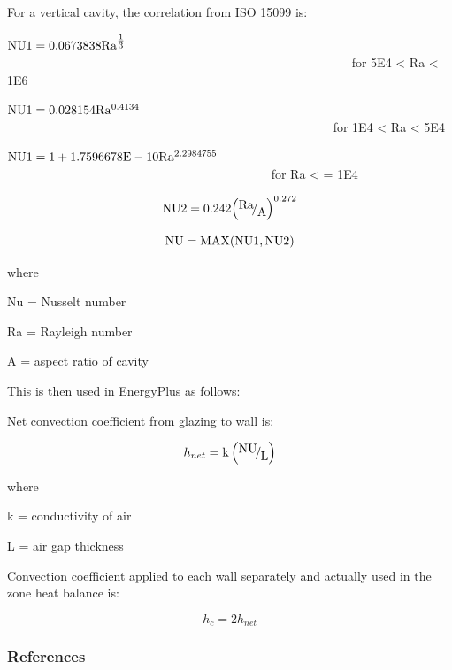 For a vertical cavity, the correlation from ISO 15099 is:

\({\rm{NU1 = 0}}{\rm{.0673838 R}}{{\rm{a}}^{{\textstyle{\frac{{\rm{1}}}{{\rm{3}}}}}}}\) ~~~~~~~~~~~~~~~~~~~~~~~~~~~~~~~~~~~~~~~~~~~~~~~~~~~~~~~ for 5E4 \textless{} Ra \textless{} 1E6

\({\rm{NU1 = 0}}{\rm{.028154 R}}{{\rm{a}}^{{\rm{0}}{\rm{.4134}}}}\) ~~~~~~~~~~~~~~~~~~~~~~~~~~~~~~~~~~~~~~~~~~~~~~~~~~~~ for 1E4 \textless{} Ra \textless{} 5E4

\({\rm{NU1 = 1 + 1}}{\rm{.7596678E - 10 R}}{{\rm{a}}^{{\rm{2}}{\rm{.2984755}}}}\) ~~~~~~~~~~~~~~~~~~~~~~~~~~~~~~~~~~~~~~~~~~ for Ra \textless{} = 1E4

\begin{equation}
{\rm{NU2}} = 0.242{\left( {{\raise0.7ex\hbox{{{\rm{Ra}}}} \!\mathord{\left/ {\vphantom {{{\rm{Ra}}} {\rm{A}}}}\right.}\!\lower0.7ex\hbox{{\rm{A}}}}} \right)^{0.272}}
\end{equation}

\begin{equation}
{\rm{NU = MAX(NU1,NU2)}}
\end{equation}

where

Nu = Nusselt number

Ra = Rayleigh number

A = aspect ratio of cavity

This is then used in EnergyPlus as follows:

Net convection coefficient from glazing to wall is:

\begin{equation}
{h_{net}} = {\rm{k}}\left( {{\raise0.7ex\hbox{{{\rm{NU}}}} \!\mathord{\left/ {\vphantom {{{\rm{NU}}} {\rm{L}}}}\right.}\!\lower0.7ex\hbox{{\rm{L}}}}} \right)
\end{equation}

where

k = conductivity of air

L = air gap thickness

Convection coefficient applied to each wall separately and actually used in the zone heat balance is:

\begin{equation}
{h_c} = 2{h_{net}}
\end{equation}

\subsubsection{References}\label{references-032}

